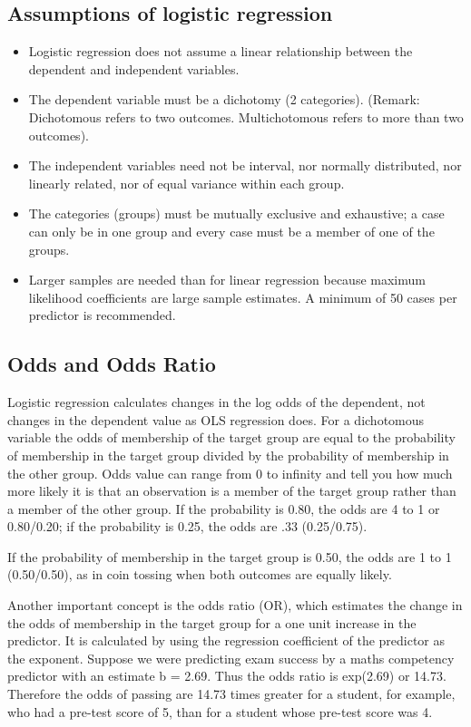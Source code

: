 \documentclass[a4paper,12pt]{article}
\begin{document}
\subsection{Assumptions of logistic regression}
\begin{itemize}
\item Logistic regression does not assume a linear relationship between the dependent and
independent variables.
\item The dependent variable must be a dichotomy (2 categories).
(Remark: Dichotomous refers to two outcomes. Multichotomous refers to more than two outcomes).
\item The independent variables need not be interval, nor normally distributed, nor linearly
related, nor of equal variance within each group.
\item The categories (groups) must be mutually exclusive and exhaustive; a case can only be
in one group and every case must be a member of one of the groups.
\item Larger samples are needed than for linear regression because maximum likelihood
coefficients are large sample estimates. A minimum of 50 cases per predictor is
recommended.
\end{itemize}

\subsection{Odds and Odds Ratio}
Logistic regression calculates changes in the log odds of the dependent,
not changes in the dependent value as OLS regression does. For a dichotomous variable the
odds of membership of the target group are equal to the probability of membership in the
target group divided by the probability of membership in the other group. Odds value can
range from 0 to infinity and tell you how much more likely it is that an observation is a
member of the target group rather than a member of the other group. If the probability is
0.80, the odds are 4 to 1 or 0.80/0.20; if the probability is 0.25, the odds are .33 (0.25/0.75).

If the probability of membership in the target group is 0.50, the odds are 1 to 1 (0.50/0.50), as
in coin tossing when both outcomes are equally likely.

Another important concept is the odds ratio (OR), which estimates the change in the
odds of membership in the target group for a one unit increase in the predictor. It is calculated by using the regression coefficient of the predictor as the exponent. Suppose we were predicting exam success by a maths competency
predictor with an estimate b = 2.69. Thus the odds ratio is exp(2.69) or 14.73. Therefore the odds of passing
are 14.73 times greater for a student, for example, who had a pre-test score of 5, than for a
student whose pre-test score was 4.
\end{document}
